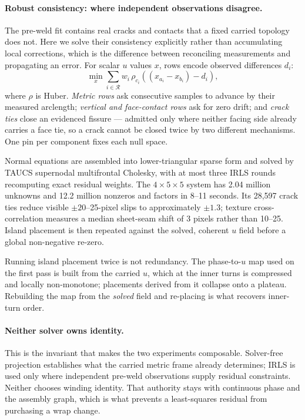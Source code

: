 \paragraph{Robust consistency: where independent observations disagree.} The pre-weld fit contains real cracks and contacts that a fixed carried topology does not. Here we solve their consistency explicitly rather than accumulating local corrections, which is the difference between reconciling measurements and propagating an error. For scalar $u$ values $x$, rows encode observed differences $d_i$:
\begin{equation*}
  \min_x \sum_{i\in\mathcal R} w_i\,\rho_{c_i}\!\left((x_{a_i}-x_{b_i})-d_i\right),
\end{equation*}
where $\rho$ is Huber. \emph{Metric rows} ask consecutive samples to advance by their measured arclength; \emph{vertical and face-contact rows} ask for zero drift; and \emph{crack ties} close an evidenced fissure --- admitted only where neither facing side already carries a face tie, so a crack cannot be closed twice by two different mechanisms. One pin per component fixes each null space.

Normal equations are assembled into lower-triangular sparse form and solved by TAUCS supernodal multifrontal Cholesky, with at most three IRLS rounds recomputing exact residual weights. The $4\times5\times5$ system has 2.04 million unknowns and 12.2 million nonzeros and factors in 8--11 seconds. Its 28,597 crack ties reduce visible $\pm20$--25-pixel slips to approximately $\pm1.3$; texture cross-correlation measures a median sheet-seam shift of 3 pixels rather than 10--25. Island placement is then repeated against the solved, coherent $u$ field before a global non-negative re-zero.

Running island placement twice is not redundancy. The phase-to-$u$ map used on the first pass is built from the carried $u$, which at the inner turns is compressed and locally non-monotone; placements derived from it collapse onto a plateau. Rebuilding the map from the \emph{solved} field and re-placing is what recovers inner-turn order.

\paragraph{Neither solver owns identity.} This is the invariant that makes the two experiments composable. Solver-free projection establishes what the carried metric frame already determines; IRLS is used only where independent pre-weld observations supply residual constraints. Neither chooses winding identity. That authority stays with continuous phase and the assembly graph, which is what prevents a least-squares residual from purchasing a wrap change.

